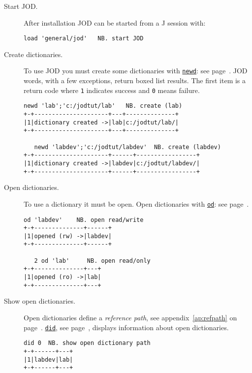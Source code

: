 
\begin{description}
\item[Start JOD.]  After installation JOD can be started from a J session with:
\begin{lstlisting}[frame=single,framerule=0pt]
   load 'general/jod'   NB. start JOD 
\end{lstlisting}


\item[Create dictionaries.] To use JOD you must create some dictionaries
with \hyperlink{il:newd}{\texttt{newd}}: see page~\pageref{ss:newd}.
JOD words, with a few exceptions, return boxed list results.  The first
item is a return code where \texttt{1} indicates success and \texttt{0} means failure.
\begin{lstlisting}[frame=single,framerule=0pt]
   newd 'lab';'c:/jodtut/lab'   NB. create (lab)
+-+---------------------+---+--------------+
|1|dictionary created ->|lab|c:/jodtut/lab/|
+-+---------------------+---+--------------+

   newd 'labdev';'c:/jodtut/labdev'  NB. create (labdev)
+-+---------------------+------+-----------------+
|1|dictionary created ->|labdev|c:/jodtut/labdev/|
+-+---------------------+------+-----------------+
\end{lstlisting}

\item[Open dictionaries.] To use a dictionary it must be open. Open
dictionaries with \hyperlink{il:odd}{\texttt{od}}: see page~\pageref{ss:od}.
\begin{lstlisting}[frame=single,framerule=0pt] 
   od 'labdev'    NB. open read/write
+-+--------------+------+
|1|opened (rw) ->|labdev|
+-+--------------+------+
 
   2 od 'lab'     NB. open read/only
+-+--------------+---+
|1|opened (ro) ->|lab|
+-+--------------+---+
\end{lstlisting}

\item[Show open dictionaries.] Open dictionaries define a \emph{reference path}, see
appendix~\ref{ap:refpath} on page~\pageref{ap:refpath}. \hyperlink{il:did}{\texttt{did}}, see page~\pageref{ss:did}, displays information about open dictionaries.
\begin{lstlisting}[frame=single,framerule=0pt]
   did 0  NB. show open dictionary path
+-+------+---+
|1|labdev|lab|
+-+------+---+
\end{lstlisting}


\end{description}
